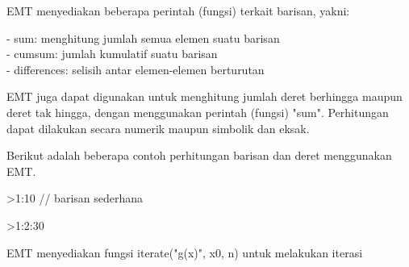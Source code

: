 \documentclass[a4paper,10pt]{article}
\begin{document}
\begin{eulernotebook}
\begin{eulercomment}
\begin{eulercomment}
\begin{eulercomment}
EMT menyediakan beberapa perintah (fungsi) terkait barisan, yakni:

- sum: menghitung jumlah semua elemen suatu barisan\\
- cumsum: jumlah kumulatif suatu barisan\\
- differences: selisih antar elemen-elemen berturutan

EMT juga dapat digunakan untuk menghitung jumlah deret berhingga maupun deret tak hingga,
dengan menggunakan perintah (fungsi) "sum". Perhitungan dapat dilakukan secara numerik
maupun simbolik dan eksak.

Berikut adalah beberapa contoh perhitungan barisan dan deret menggunakan EMT.
\end{eulercomment}
\begin{eulerprompt}
>1:10 // barisan sederhana
\end{eulerprompt}
\begin{euleroutput}
  [1,  2,  3,  4,  5,  6,  7,  8,  9,  10]
\end{euleroutput}
\begin{eulerprompt}
>1:2:30
\end{eulerprompt}
\begin{euleroutput}
  [1,  3,  5,  7,  9,  11,  13,  15,  17,  19,  21,  23,  25,  27,  29]
\end{euleroutput}
\begin{eulercomment}
EMT menyediakan fungsi iterate("g(x)", x0, n) untuk melakukan iterasi


\end{eulercomment}
\end{eulercomment}
\end{eulercomment}
\end{eulernotebook}
\end{document}
